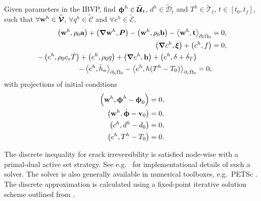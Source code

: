 \begin{mdframed}[
    frametitle={The Galerkin form},
    frametitlebackgroundcolor=gray!20,
    backgroundcolor=gray!5,
    linewidth=0pt,
    nobreak=true
  ]
  Given parameters in the IBVP, find $\boldsymbol{\upphi}^h \in \widetilde{\boldsymbol{\mathcal{U}}}_t$, $d^h \in \widetilde{\mathcal{D}}_t$ and $T^h \in \widetilde{\mathcal{T}}_t$, $t \in [t_0, t_f]$, such that $\forall \textbf{w}^h \in \widetilde{\boldsymbol{\mathcal{V}}}$, $\forall q^h \in \widetilde{\mathcal{C}}$ and $\forall e^h \in \widetilde{\mathcal{E}}$,
  \begin{subequations}
    \begin{align}
      \left( \textbf{w}^h, \rho_0\textbf{a} \right) + \left( \boldsymbol{\nabla} \textbf{w}^h, \boldsymbol{P} \right) - \left( \textbf{w}^h, \rho_0 \textbf{b} \right) - \left< \textbf{w}^h, \textbf{t} \right>_{\partial_t\Omega_0} &= 0,    \\
      \left( \boldsymbol{\nabla} c^h, \boldsymbol{\xi} \right) + \left( c^h, f \right) &= 0, \\
      \begin{split}
        - \left( e^h, \rho_0c_v\dot{T} \right) + \left( e^h, \rho_0q \right) + \left( \boldsymbol{\nabla} e^h, \textbf{h} \right) + \left( e^h, \delta+\delta_T \right)& \\
        - \left< e^h, \bar{h}_n \right>_{\partial_h\Omega_0} - \left< e^h, h(T^h-T_0) \right>_{\partial_r\Omega_0} &= 0,
      \end{split} 
    \end{align}
  \end{subequations}
  with projections of initial conditions
  \begin{subequations}
  \begin{align}
      \left( \textbf{w}^h, \boldsymbol{\upphi}^h - \boldsymbol{\upphi}_0 \right) &= 0, \\
      \left( \textbf{w}^h, \dot{\boldsymbol{\upphi}} - \textbf{v}_0 \right) &= 0, \\
      \left( c^h, d^h - d_0 \right) &= 0, \\
      \left( e^h, T^h - T_0 \right) &= 0.
  \end{align}
  \end{subequations}
\end{mdframed}
The discrete inequality for crack irreversibility is satisfied node-wise with a primal-dual active set strategy. See e.g.\  \citet{heister2015primal} for implementational details of such a solver. The solver is also generally available in numerical toolboxes, e.g.\  PETSc \cite{petsc-web-page}. The discrete approximation is calculated using a fixed-point iterative solution scheme outlined from \cite{HuGary2020}.
